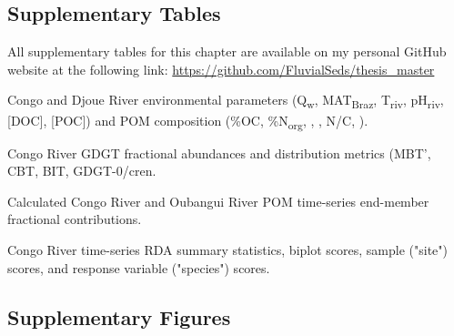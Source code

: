 \clearpage

\subsection{Supplementary Tables}

\renewcommand\thetable{\thechapter.S\arabic{table}}    
\setcounter{table}{0}  

\captionsetup[table]{justification=raggedright,singlelinecheck=off}

All supplementary tables for this chapter are available on my personal GitHub website at the following link: \url{https://github.com/FluvialSeds/thesis_master}

\begin{table}[h!]
	\caption[Congo and Djoue River environmental and POM measurements]{Congo and Djoue River environmental parameters (Q\textsubscript{w}, MAT\textsubscript{Braz}, T\textsubscript{riv}, pH\textsubscript{riv}, [DOC], [POC]) and POM composition (\%OC, \%N\textsubscript{org}, , , N/C, ).}
	\label{Ch5Tab:S1} 
\end{table}

\begin{table}[h!]
	\caption[Congo River GDGT fractional abundances and metrics]{Congo River GDGT fractional abundances and distribution metrics (MBT', CBT, BIT, GDGT-0/cren.}
	\label{Ch5Tab:S2} 
\end{table}

\begin{table}[h!]
	\caption[End-member fractional contributions]{Calculated Congo River and Oubangui River POM time-series end-member fractional contributions.}
	\label{Ch5Tab:S3} 
\end{table}

\begin{table}[h!]
	\caption[RDA summary statistics and scores]{Congo River time-series RDA summary statistics, biplot scores, sample ("site") scores, and response variable ("species") scores.}
	\label{Ch5Tab:S4} 
\end{table}

\renewcommand\thetable{\thechapter.\arabic{table}}

\captionsetup[table]{justification=justified}

\clearpage

\subsection{Supplementary Figures}
\renewcommand\thefigure{\thechapter.S\arabic{figure}}    
\setcounter{figure}{0}  


